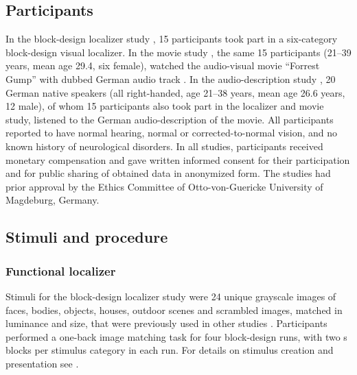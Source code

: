 \subsection{Participants}

In the block-design localizer study \citep{sengupta2016extension}, 15
participants took part in a six-category block-design visual localizer.
In the movie study \citep{hanke2016simultaneous}, the same 15 participants
(21–39 years, mean age 29.4, six female), watched the audio-visual movie
``Forrest Gump'' \citep{ForrestGumpMovie} with dubbed German audio track
\citep{ForrestGumpDVD}.
In the audio-description study \citep{hanke2014audiomovie}, 20 German native
speakers (all right-handed, age 21–38 years, mean age 26.6 years, 12 male), of
whom 15 participants also took part in the localizer and movie study, listened
to the German audio-description \citep{ForrestGumpGermanAD} of the movie.
All participants reported to have normal hearing, normal or corrected-to-normal
vision, and no known history of neurological disorders.
In all studies, participants received monetary compensation and gave written
informed consent for their participation and for public sharing of obtained data
in anonymized form. The studies had prior approval by the Ethics Committee of
Otto-von-Guericke University of Magdeburg, Germany.


\subsection{Stimuli and procedure}


\subsubsection{Functional localizer}

Stimuli for the block-design localizer study were 24 unique grayscale images of
faces, bodies, objects, houses, outdoor scenes and scrambled images, matched in
luminance and size, that were previously used in other studies
\citep[e.g.,][]{haxby2011common}.
Participants performed a one-back image matching task for four block-design
runs, with two \unit[16]{s} blocks per stimulus category in each run.
%
For details on stimulus creation and presentation see
\citet{sengupta2016extension}.


